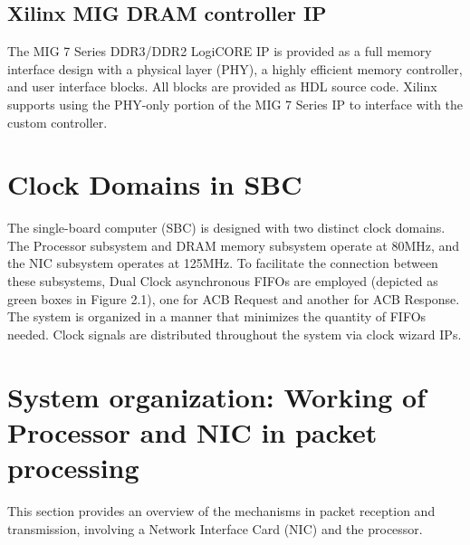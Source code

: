 \documentclass[12pt]{report}
\begin{document}
\subsection{Xilinx MIG DRAM controller IP}
The MIG 7 Series DDR3/DDR2 LogiCORE IP is provided as a full memory interface design with a physical layer (PHY), a highly efficient memory controller, and user interface blocks. All blocks are provided as HDL source code. Xilinx supports using the PHY-only portion of the MIG 7 Series IP to interface with the custom controller.

\section{Clock Domains in SBC}
The single-board computer (SBC) is designed with two distinct clock domains. The Processor subsystem and DRAM memory subsystem operate at 80MHz, and the NIC subsystem operates at 125MHz. To facilitate the connection between these subsystems, Dual Clock asynchronous FIFOs are employed (depicted as green boxes in Figure 2.1), one for ACB Request and another for ACB Response. The system is organized in a manner that minimizes the quantity of FIFOs needed. Clock signals are distributed throughout the system via clock wizard IPs.


\section{System organization: Working of Processor and NIC in packet processing}
This section provides an overview of the mechanisms in packet reception and transmission, involving a Network Interface Card (NIC) and the processor.
\end{document}
